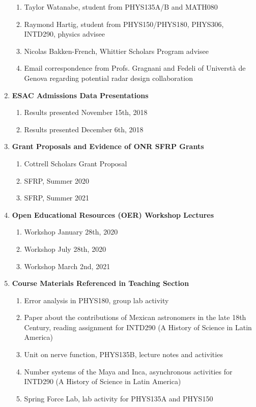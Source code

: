 \documentclass[../../main.tex]{subfiles}
\begin{document}
\begin{enumerate}
\begin{enumerate}
\item Taylor Watanabe, student from PHYS135A/B and MATH080
\item Raymond Hartig, student from PHYS150/PHYS180, PHYS306, INTD290, physics advisee
\item Nicolas Bakken-French, Whittier Scholars Program advisee
\item Email correspondence from Profs. Gragnani and Fedeli of Universt\`{a} de Genova regarding potential radar design collaboration
\end{enumerate}
\item \textbf{ESAC Admissions Data Presentations}
\begin{enumerate}
\item Results presented November 15th, 2018
\item Results presented December 6th, 2018
\end{enumerate}
\item \textbf{Grant Proposals and Evidence of ONR SFRP Grants}
\begin{enumerate}
\item Cottrell Scholars Grant Proposal
\item SFRP, Summer 2020
\item SFRP, Summer 2021
\end{enumerate}
\item \textbf{Open Educational Resources (OER) Workshop Lectures}
\begin{enumerate}
\item Workshop January 28th, 2020
\item Workshop July 28th, 2020
\item Workshop March 2nd, 2021
\end{enumerate}
\item \textbf{Course Materials Referenced in Teaching Section}
\begin{enumerate}
\item Error analysis in PHYS180, group lab activity
\item Paper about the contributions of Mexican astronomers in the late 18th Century, reading assignment for INTD290 (A History of Science in Latin America)
\item Unit on nerve function, PHYS135B, lecture notes and activities
\item Number systems of the Maya and Inca, asynchronous activities for INTD290 (A History of Science in Latin America)
\item Spring Force Lab, lab activity for PHYS135A and PHYS150

\end{enumerate}
\end{enumerate}
\end{document}

